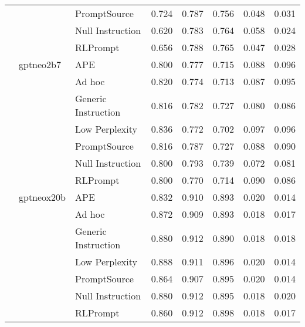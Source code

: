 \begin{supertabular}{lllrrrrr}
              &        & PromptSource &            0.724 &           0.787 &          0.756 &        0.048 &    0.031 \\
              &        & Null Instruction &            0.620 &           0.783 &          0.764 &        0.058 &    0.024 \\
              &        & RLPrompt &            0.656 &           0.788 &          0.765 &        0.047 &    0.028 \\
              & gptneo2b7 & APE &            0.800 &           0.777 &          0.715 &        0.088 &    0.096 \\
              &        & Ad hoc &            0.820 &           0.774 &          0.713 &        0.087 &    0.095 \\
              &        & Generic Instruction &            0.816 &           0.782 &          0.727 &        0.080 &    0.086 \\
              &        & Low Perplexity &            0.836 &           0.772 &          0.702 &        0.097 &    0.096 \\
              &        & PromptSource &            0.816 &           0.787 &          0.727 &        0.088 &    0.090 \\
              &        & Null Instruction &            0.800 &           0.793 &          0.739 &        0.072 &    0.081 \\
              &        & RLPrompt &            0.800 &           0.770 &          0.714 &        0.090 &    0.086 \\
              & gptneox20b & APE &            0.832 &           0.910 &          0.893 &        0.020 &    0.014 \\
              &        & Ad hoc &            0.872 &           0.909 &          0.893 &        0.018 &    0.017 \\
              &        & Generic Instruction &            0.880 &           0.912 &          0.890 &        0.018 &    0.018 \\
              &        & Low Perplexity &            0.888 &           0.911 &          0.896 &        0.020 &    0.014 \\
              &        & PromptSource &            0.864 &           0.907 &          0.895 &        0.020 &    0.014 \\
              &        & Null Instruction &            0.880 &           0.912 &          0.895 &        0.018 &    0.020 \\
              &        & RLPrompt &            0.860 &           0.912 &          0.898 &        0.018 &    0.017 \\

\end{supertabular}
